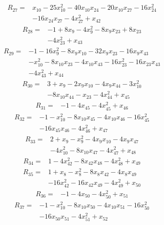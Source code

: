 \begin{align*} R_{27}={}&x_{10} -25 x_{10}^{2} -40 x_{10}x_{24} -20 x_{10}x_{27} -16 x_{24}^{2}
\\ &-16 x_{24}x_{27} -4 x_{27}^{2} +x_{42}
\end{align*}
\begin{align*} R_{28}={}&-1 +8 x_{9} -4 x_{9}^{2} -8 x_{9}x_{23} +8 x_{23}
\\ &-4 x_{23}^{2} +x_{43}
\end{align*}
\begin{align*} R_{29}={}&-1 -16 x_{9}^{2} -8 x_{9}x_{10} -32 x_{9}x_{23} -16 x_{9}x_{43}
\\ &-x_{10}^{2} -8 x_{10}x_{23} -4 x_{10}x_{43} -16 x_{23}^{2} -16 x_{23}x_{43}
\\ &-4 x_{43}^{2} +x_{44}
\end{align*}
\begin{align*} R_{30}={}&3 +x_{9} -2 x_{9}x_{10} -4 x_{9}x_{44} -3 x_{10}^{2}
\\ &-8 x_{10}x_{44} -x_{23} -4 x_{44}^{2} +x_{45}
\end{align*}
\begin{align*} R_{31}={}&-1 -4 x_{45} -4 x_{45}^{2} +x_{46}
\end{align*}
\begin{align*} R_{32}={}&-1 -x_{10}^{2} -8 x_{10}x_{45} -4 x_{10}x_{46} -16 x_{45}^{2}
\\ &-16 x_{45}x_{46} -4 x_{46}^{2} +x_{47}
\end{align*}
\begin{align*} R_{33}={}&2 +x_{9} -x_{9}^{2} -4 x_{9}x_{10} -4 x_{9}x_{47}
\\ &-4 x_{10}^{2} -8 x_{10}x_{47} -4 x_{47}^{2} +x_{48}
\end{align*}
\begin{align*} R_{34}={}&1 -4 x_{42}^{2} -8 x_{42}x_{48} -4 x_{48}^{2} +x_{49}
\end{align*}
\begin{align*} R_{35}={}&1 +x_{8} -x_{8}^{2} -8 x_{8}x_{42} -4 x_{8}x_{49}
\\ &-16 x_{42}^{2} -16 x_{42}x_{49} -4 x_{49}^{2} +x_{50}
\end{align*}
\begin{align*} R_{36}={}&-1 -4 x_{50} -4 x_{50}^{2} +x_{51}
\end{align*}
\begin{align*} R_{37}={}&-1 -x_{10}^{2} -8 x_{10}x_{50} -4 x_{10}x_{51} -16 x_{50}^{2}
\\ &-16 x_{50}x_{51} -4 x_{51}^{2} +x_{52}
\end{align*}
